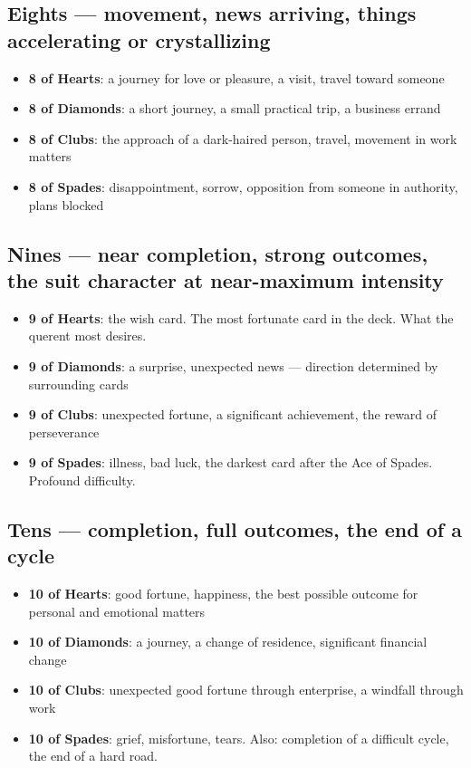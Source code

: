 \subsection{Eights --- movement, news arriving, things accelerating or crystallizing}\label{eights--movement-news-arriving-things-accelerating-or-crystallizing}

\begin{itemize}
\tightlist
\item
  \textbf{8 of Hearts}: a journey for love or pleasure, a visit, travel toward someone
\item
  \textbf{8 of Diamonds}: a short journey, a small practical trip, a business errand
\item
  \textbf{8 of Clubs}: the approach of a dark-haired person, travel, movement in work matters
\item
  \textbf{8 of Spades}: disappointment, sorrow, opposition from someone in authority, plans blocked
\end{itemize}

\subsection{Nines --- near completion, strong outcomes, the suit character at near-maximum intensity}\label{nines--near-completion-strong-outcomes-the-suit-character-at-near-maximum-intensity}

\begin{itemize}
\tightlist
\item
  \textbf{9 of Hearts}: the wish card. The most fortunate card in the deck. What the querent most desires.
\item
  \textbf{9 of Diamonds}: a surprise, unexpected news --- direction determined by surrounding cards
\item
  \textbf{9 of Clubs}: unexpected fortune, a significant achievement, the reward of perseverance
\item
  \textbf{9 of Spades}: illness, bad luck, the darkest card after the Ace of Spades. Profound difficulty.
\end{itemize}

\subsection{Tens --- completion, full outcomes, the end of a cycle}\label{tens--completion-full-outcomes-the-end-of-a-cycle}

\begin{itemize}
\tightlist
\item
  \textbf{10 of Hearts}: good fortune, happiness, the best possible outcome for personal and emotional matters
\item
  \textbf{10 of Diamonds}: a journey, a change of residence, significant financial change
\item
  \textbf{10 of Clubs}: unexpected good fortune through enterprise, a windfall through work
\item
  \textbf{10 of Spades}: grief, misfortune, tears. Also: completion of a difficult cycle, the end of a hard road.
\end{itemize}

